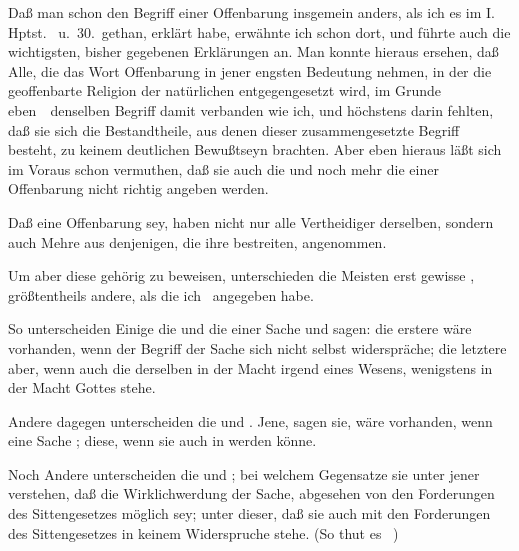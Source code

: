 \begin{aufza}
\item Daß man schon den Begriff einer Offenbarung insgemein anders, als ich es im I.\,Hptst.\  u.\ 30.\ gethan, erklärt habe, erwähnte ich schon dort, und führte  auch die wichtigsten, bisher gegebenen Erklärungen an. Man konnte hieraus ersehen, daß Alle, die das Wort Offenbarung in jener engsten Bedeutung nehmen, in der die geoffenbarte Religion der natürlichen entgegengesetzt wird, im Grunde eben~\ denselben Begriff damit verbanden wie ich, und höchstens darin fehlten, daß sie sich die Bestandtheile, aus denen dieser zusammengesetzte Begriff besteht, zu keinem deutlichen Bewußtseyn brachten. Aber eben hieraus läßt sich im Voraus schon vermuthen, daß sie auch die  und noch mehr die  einer Offenbarung nicht richtig angeben werden.
\item Daß eine Offenbarung  sey, haben nicht nur alle Vertheidiger derselben, sondern auch Mehre aus denjenigen, die ihre  bestreiten, angenommen.
\item Um aber diese  gehörig zu beweisen, unterschieden die Meisten erst gewisse , größtentheils andere, als die ich \ angegeben habe.
\begin{aufzb}
\item So unterscheiden Einige die  und die  einer Sache und sagen: die erstere wäre vorhanden, wenn der Begriff der Sache sich nicht selbst widerspräche; die letztere aber, wenn auch die  derselben in der Macht irgend eines Wesens, wenigstens in der Macht Gottes stehe.
\item Andere dagegen unterscheiden die  und . Jene, sagen sie, wäre vorhanden, wenn eine Sache ; diese, wenn sie auch in  werden könne.
\item Noch Andere unterscheiden die  und ; bei welchem Gegensatze sie unter jener verstehen, daß die Wirklichwerdung der Sache, abgesehen von den Forderungen des Sittengesetzes möglich sey; unter dieser, daß sie auch mit den Forderungen des Sittengesetzes in keinem Widerspruche stehe. (So thut es \zB\ )
\end{aufzb}

\end{aufza}

